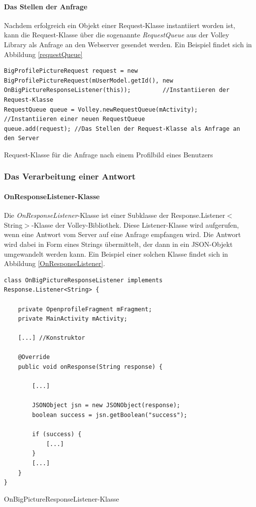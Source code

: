 \documentclass[../main.tex]{subfiles}
\begin{document}
	\paragraph{Das Stellen der Anfrage}
	Nachdem erfolgreich ein Objekt einer Request-Klasse instantiiert worden ist, kann die Request-Klasse über die sogenannte \emph{RequestQueue} aus der Volley Library als Anfrage an den Webserver gesendet werden. Ein Beispiel findet sich in Abbildung \ref{requestQueue}
	
\begin{code}
	\begin{center}
		\begin{verbatim}
BigProfilePictureRequest request = new BigProfilePictureRequest(mUserModel.getId(), new OnBigPictureResponseListener(this)); 		 //Instantiieren der Request-Klasse
RequestQueue queue = Volley.newRequestQueue(mActivity); //Instantiieren einer neuen RequestQueue
queue.add(request); //Das Stellen der Request-Klasse als Anfrage an den Server
		\end{verbatim}
		\caption{Request-Klasse für die Anfrage nach einem Profilbild eines Benutzers}
		\label{requestQueue}
	\end{center}
\end{code}	
	
	\subsubsection{Das Verarbeitung einer Antwort} \label{responseListener}
	\paragraph{OnResponseListener-Klasse} Die \emph{OnResponseListener}-Klasse ist einer Subklasse der Response.Listener$<$String$>$-Klasse der Volley-Bibliothek. Diese Listener-Klasse wird aufgerufen, wenn eine Antwort vom Server auf eine Anfrage empfangen wird. Die Antwort wird dabei in Form eines Strings übermittelt, der dann in ein JSON-Objekt umgewandelt werden kann. Ein Beispiel einer solchen Klasse findet sich in Abbildung \ref{OnResponseListener}.
	
\begin{code}
	\begin{center}
		\begin{verbatim}
class OnBigPictureResponseListener implements Response.Listener<String> {

	private OpenprofileFragment mFragment;
	private MainActivity mActivity;

	[...] //Konstruktor

	@Override
	public void onResponse(String response) {
		
		[...]

		JSONObject jsn = new JSONObject(response);
		boolean success = jsn.getBoolean("success");

		if (success) {
			[...]
		}
		[...]
	}
}
		\end{verbatim}
		\caption{OnBigPictureResponseListener-Klasse}
		\label{OnResponseListener}
	\end{center}
\end{code}		
	
\end{document}
